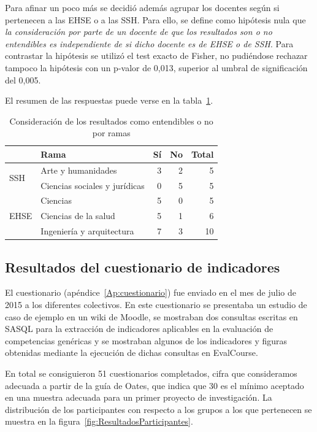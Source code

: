 Para afinar un poco más se decidió además agrupar los docentes según si pertenecen a las EHSE o a  las SSH. Para ello, se define como hipótesis nula que \emph{la consideración por parte de un docente de que los resultados son o no entendibles es independiente de si dicho docente es de EHSE o de SSH}. Para contrastar la hipótesis se utilizó el test exacto de Fisher, no pudiéndose rechazar tampoco la hipótesis con un p-valor de 0,013, superior al umbral de significación del 0,005.

El resumen de las respuestas puede verse en la tabla~\ref{tab:cap:encuesta:resultados:rama}.

\begin{table}
  \begin{center}
  \begin{tabular}{| l | l | r | r | r |}
    \hline
    & Rama & Sí & No & Total \\
    \hline
    \hline
    \multirow{2}{2.5cm}{SSH} & Arte y humanidades & 3 & 2 & 5  \\
    \cline{2-5}
    & Ciencias sociales y jurídicas & 0 & 5 & 5  \\
    \hline
    \multirow{3}{2.5cm}{EHSE} & Ciencias & 5 & 0 & 5  \\
    \cline{2-5}
    & Ciencias de la salud & 5 & 1 & 6  \\
    \cline{2-5}
    & Ingeniería y arquitectura & 7 & 3 & 10 \\
    \hline
  \end{tabular}
\end{center}
\caption{Consideración de los resultados como entendibles o no por ramas}
\label{tab:cap:encuesta:resultados:rama}
\end{table}


\subsection{Resultados del cuestionario de indicadores}

El cuestionario (apéndice~\ref{Ap:cuestionario}) fue enviado en el mes de julio de 2015 a los diferentes colectivos. En este cuestionario se presentaba un estudio de caso de ejemplo en un wiki de Moodle, se mostraban dos consultas escritas en SASQL para la extracción de indicadores aplicables en la evaluación de competencias genéricas y se mostraban algunos de los indicadores y figuras obtenidas mediante la ejecución de dichas consultas en EvalCourse. 

En total se consiguieron 51 cuestionarios completados, cifra que consideramos adecuada a partir de la guía de Oates, que indica que 30 es el mínimo aceptado en una muestra adecuada para un primer proyecto de investigación. La distribución de los participantes con respecto a los grupos a los que pertenecen se muestra en la figura~\ref{fig:ResultadosParticipantes}.

